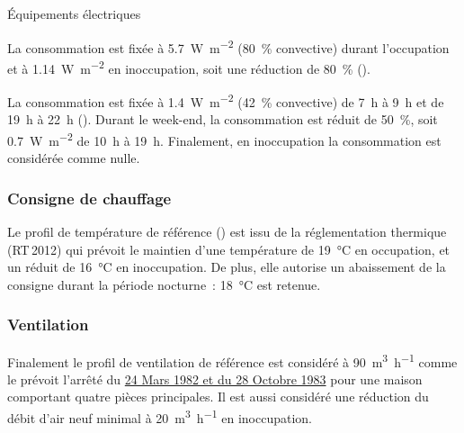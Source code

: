 \begin{blockdescription}{Équipements électriques}
    \item[Équipements électriques~:] La consommation est fixée à \SI{5.7}{\watt\per m^{2}} (\SI{80}{\percent}
                                      convective) durant l’occupation et à \SI{1.14}{\watt\per m^{2}} en inoccupation, soit une
                                      réduction de \SI{80}{\percent} ().
    \item[Éclairage~:] La consommation est fixée à \SI{1.4}{\watt\per m^{2}} (\SI{42}{\percent} convective) de
                       \SI{7}{\hour} à \SI{9}{\hour} et de \SI{19}{\hour} à \SI{22}{\hour}
                       (). Durant le week-end, la consommation est réduit de
                       \SI{50}{\percent}, soit \SI{0.7}{\watt\per m^{2}} de \SI{10}{\hour} à \SI{19}{\hour}.
                       Finalement, en inoccupation la consommation est considérée comme nulle.
\end{blockdescription}


\subsubsection{Consigne de chauffage} %
\label{ssub:consigne_de_chauffage}
Le profil de température de référence () est issu de la
réglementation thermique (RT\,2012) qui prévoit le maintien d’une température de
\SI{19}{\celsius} en occupation, et un réduit de \SI{16}{\celsius} en inoccupation. De plus,
elle autorise un abaissement de la consigne durant la période nocturne~: \SI{18}{\celsius} est
retenue.

\subsubsection{Ventilation} %
\label{ssub:ventilation_ref}
Finalement le profil de ventilation de référence est considéré à \SI[per-mode=symbol]{90}{\meter\cubed\per\hour}
comme le prévoit l’arrêté du \href{https://www.legifrance.gouv.fr/affichTexte.do?cidTexte=JORFTEXT000000862344}{24 Mars
1982 et du 28 Octobre 1983} pour une maison comportant quatre pièces principales. Il est aussi
considéré une réduction du débit d’air neuf minimal à \SI[per-mode=symbol]{20}{\meter\cubed\per\hour}
en inoccupation.

